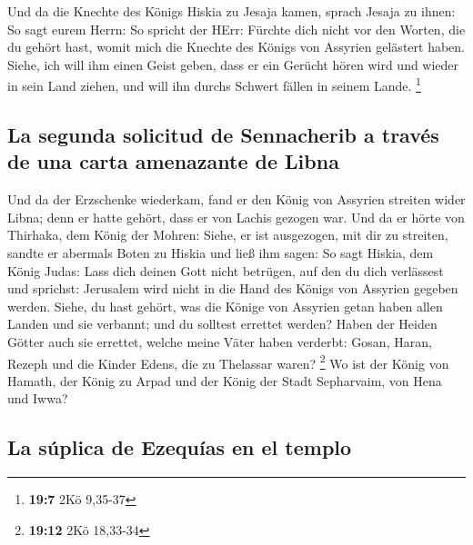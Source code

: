  Und da die Knechte des Königs Hiskia zu Jesaja kamen,
 sprach Jesaja zu ihnen: So sagt eurem Herrn: So spricht
der HErr: Fürchte dich nicht vor den Worten, die du gehört hast, womit
mich die Knechte des Königs von Assyrien gelästert haben. 
Siehe, ich will ihm einen Geist geben, dass er ein Gerücht hören wird
und wieder in sein Land ziehen, und will ihn durchs Schwert fällen in
seinem Lande. \footnote{\textbf{19:7} 2Kö 9,35-37}

\hypertarget{la-segunda-solicitud-de-sennacherib-a-travuxe9s-de-una-carta-amenazante-de-libna}{%
\subsection{La segunda solicitud de Sennacherib a través de una carta
amenazante de
Libna}\label{la-segunda-solicitud-de-sennacherib-a-travuxe9s-de-una-carta-amenazante-de-libna}}

 Und da der Erzschenke wiederkam, fand er den König von
Assyrien streiten wider Libna; denn er hatte gehört, dass er von Lachis
gezogen war.  Und da er hörte von Thirhaka, dem König der
Mohren: Siehe, er ist ausgezogen, mit dir zu streiten, sandte er
abermals Boten zu Hiskia und ließ ihm sagen:  So sagt
Hiskia, dem König Judas: Lass dich deinen Gott nicht betrügen, auf den
du dich verlässest und sprichst: Jerusalem wird nicht in die Hand des
Königs von Assyrien gegeben werden.  Siehe, du hast
gehört, was die Könige von Assyrien getan haben allen Landen und sie
verbannt; und du solltest errettet werden?  Haben der
Heiden Götter auch sie errettet, welche meine Väter haben verderbt:
Gosan, Haran, Rezeph und die Kinder Edens, die zu Thelassar waren?
\footnote{\textbf{19:12} 2Kö 18,33-34}  Wo ist der König
von Hamath, der König zu Arpad und der König der Stadt Sepharvaim, von
Hena und Iwwa?

\hypertarget{la-suxfaplica-de-ezequuxedas-en-el-templo}{%
\subsection{La súplica de Ezequías en el
templo}\label{la-suxfaplica-de-ezequuxedas-en-el-templo}}

